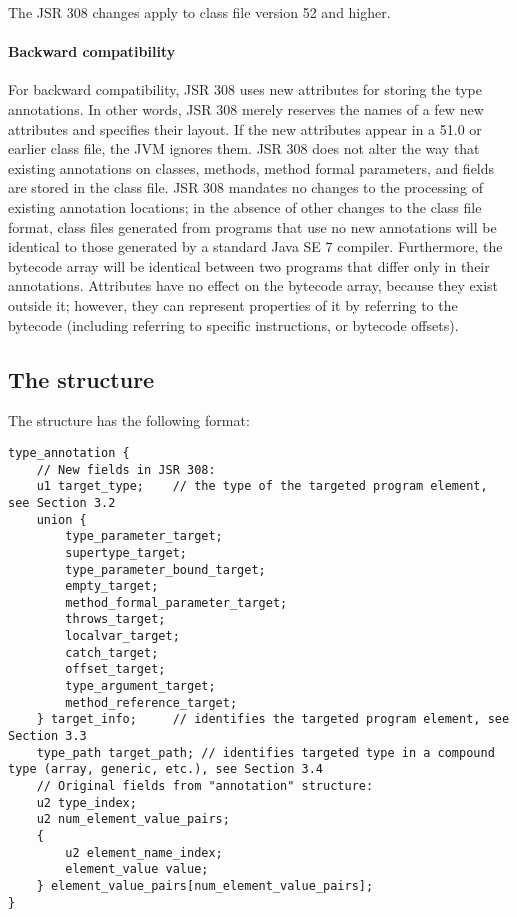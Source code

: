 \documentclass[10pt]{article}
\newcommand{\preverbnegspace}{\vspace{-5pt}}
\begin{document}

The JSR 308 changes apply to class file version 52 and higher.


\paragraph{Backward compatibility}
For backward compatibility, JSR 308 uses new attributes for storing
the type annotations.  In other words, JSR 308 merely reserves the
names of a few new attributes and specifies their layout.
If the new attributes appear in a 51.0 or earlier
class file, the JVM ignores them.
JSR 308 does
not alter the way that existing annotations on classes, methods, method formal parameters,
and fields are stored in the class file.
JSR 308 mandates no changes to the processing of existing annotation locations;
in the absence of other changes to the class file format,
class files generated from programs that use no new
annotations will be identical to those generated by a standard Java SE 7
compiler.
Furthermore, the bytecode array will be identical between two programs that
differ only in their annotations.
Attributes have no effect on the bytecode array, because they exist outside
it; however, they can represent properties of it by referring to the
bytecode (including referring to specific instructions, or bytecode offsets).


\subsection{The  structure\label{class-file:ext}}

The \extendedannotation structure has the following format:

\preverbnegspace
\begin{Verbatim}
type_annotation {
    // New fields in JSR 308:
    u1 target_type;    // the type of the targeted program element, see Section 3.2
    union {
        type_parameter_target;
        supertype_target;
        type_parameter_bound_target;
        empty_target;
        method_formal_parameter_target;
        throws_target;
        localvar_target;
        catch_target;
        offset_target;
        type_argument_target;
        method_reference_target;
    } target_info;     // identifies the targeted program element, see Section 3.3
    type_path target_path; // identifies targeted type in a compound type (array, generic, etc.), see Section 3.4
    // Original fields from "annotation" structure:
    u2 type_index;
    u2 num_element_value_pairs;
    {
        u2 element_name_index;
        element_value value;
    } element_value_pairs[num_element_value_pairs];
}
\end{Verbatim}
\end{document}
